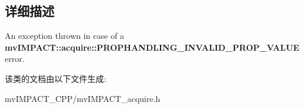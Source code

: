 \subsection{详细描述}
An exception thrown in case of a {\bfseries mv\+I\+M\+P\+A\+C\+T\+::acquire\+::\+P\+R\+O\+P\+H\+A\+N\+D\+L\+I\+N\+G\+\_\+\+I\+N\+V\+A\+L\+I\+D\+\_\+\+P\+R\+O\+P\+\_\+\+V\+A\+L\+U\+E} error. 

该类的文档由以下文件生成\+:\begin{DoxyCompactItemize}
\item 
mv\+I\+M\+P\+A\+C\+T\+\_\+\+C\+P\+P/mv\+I\+M\+P\+A\+C\+T\+\_\+acquire.\+h\end{DoxyCompactItemize}
